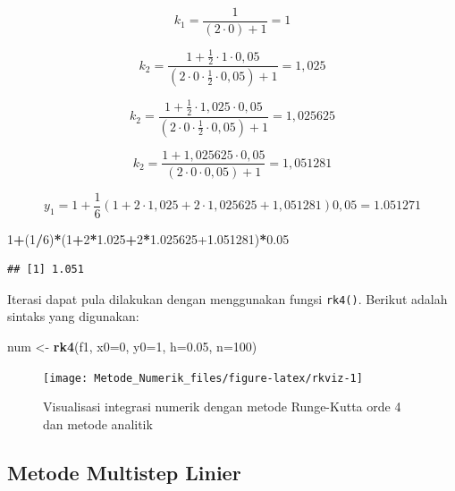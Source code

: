 \documentclass[
]{book}
\newenvironment{Shaded}{\begin{snugshade}}{\end{snugshade}}
\newcommand{\AttributeTok}[1]{\textcolor[rgb]{0.13,0.29,0.53}{#1}}
\newcommand{\DecValTok}[1]{\textcolor[rgb]{0.00,0.00,0.81}{#1}}
\newcommand{\FloatTok}[1]{\textcolor[rgb]{0.00,0.00,0.81}{#1}}
\newcommand{\FunctionTok}[1]{\textcolor[rgb]{0.13,0.29,0.53}{\textbf{#1}}}
\newcommand{\NormalTok}[1]{#1}
\newcommand{\OtherTok}[1]{\textcolor[rgb]{0.56,0.35,0.01}{#1}}
\newcommand{\SpecialCharTok}[1]{\textcolor[rgb]{0.81,0.36,0.00}{\textbf{#1}}}
\theoremstyle{definition}
\theoremstyle{definition}
\theoremstyle{definition}
\theoremstyle{definition}
\theoremstyle{remark}
\begin{document}
\[
k_1=\frac{1}{\left(2\cdot 0\right)+1}=1
\]

\[
k_2=\frac{1+\frac{1}{2}\cdot1\cdot0,05}{\left(2\cdot 0\cdot\frac{1}{2}\cdot0,05\right)+1}=1,025
\]

\[
k_2=\frac{1+\frac{1}{2}\cdot1,025\cdot0,05}{\left(2\cdot 0\cdot\frac{1}{2}\cdot0,05\right)+1}=1,025625
\]

\[
k_2=\frac{1+1,025625\cdot0,05}{\left(2\cdot 0\cdot0,05\right)+1}=1,051281
\]

\[
y_1=1+\frac{1}{6}\left(1+2\cdot1,025+2\cdot1,025625+1,051281\right)0,05=1.051271
\]

\begin{Shaded}
\begin{Highlighting}[]
\DecValTok{1}\SpecialCharTok{+}\NormalTok{(}\DecValTok{1}\SpecialCharTok{/}\DecValTok{6}\NormalTok{)}\SpecialCharTok{*}\NormalTok{(}\DecValTok{1}\SpecialCharTok{+}\DecValTok{2}\SpecialCharTok{*}\FloatTok{1.025}\SpecialCharTok{+}\DecValTok{2}\SpecialCharTok{*}\FloatTok{1.025625+1.051281}\NormalTok{)}\SpecialCharTok{*}\FloatTok{0.05}
\end{Highlighting}
\end{Shaded}

\begin{verbatim}
## [1] 1.051
\end{verbatim}

Iterasi dapat pula dilakukan dengan menggunakan fungsi \texttt{rk4()}. Berikut adalah sintaks yang digunakan:

\begin{Shaded}
\begin{Highlighting}[]
\NormalTok{num }\OtherTok{\textless{}{-}} \FunctionTok{rk4}\NormalTok{(f1, }\AttributeTok{x0=}\DecValTok{0}\NormalTok{, }\AttributeTok{y0=}\DecValTok{1}\NormalTok{, }\AttributeTok{h=}\FloatTok{0.05}\NormalTok{, }\AttributeTok{n=}\DecValTok{100}\NormalTok{)}
\end{Highlighting}
\end{Shaded}

\begin{figure}

{\centering \texttt{[image: Metode\_Numerik\_files/figure-latex/rkviz-1]} 

}

\caption{Visualisasi integrasi numerik dengan metode Runge-Kutta orde 4 dan metode analitik}\label{fig:rkviz}
\end{figure}

\hypertarget{mml}{%
\subsection{Metode Multistep Linier}\label{mml}}
\end{document}
